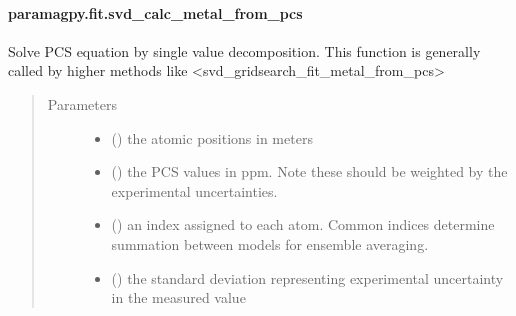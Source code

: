 \documentclass[a4paper,10pt,english,openany,oneside]{sphinxmanual}
\begin{document}
\paragraph{paramagpy.fit.svd\_calc\_metal\_from\_pcs}
\label{\detokenize{reference/generated/paramagpy.fit.svd_calc_metal_from_pcs:paramagpy-fit-svd-calc-metal-from-pcs}}\label{\detokenize{reference/generated/paramagpy.fit.svd_calc_metal_from_pcs::doc}}

\begin{fulllineitems}
\label{\detokenize{reference/generated/paramagpy.fit.svd_calc_metal_from_pcs:paramagpy.fit.svd_calc_metal_from_pcs}}
Solve PCS equation by single value decomposition.
This function is generally called by higher methods like
\textless{}svd\_gridsearch\_fit\_metal\_from\_pcs\textgreater{}
\begin{quote}\begin{description}
\item[{Parameters}] \leavevmode\begin{itemize}
\item {} 
 (\sphinxstyleliteralemphasis{\sphinxupquote{ {[}}}\sphinxstyleliteralemphasis{\sphinxupquote{,}}\sphinxstyleliteralemphasis{\sphinxupquote{,}}\sphinxstyleliteralemphasis{\sphinxupquote{{]} }}) \textendash{} the atomic positions in meters

\item {} 
 () \textendash{} the PCS values in ppm. Note these should be weighted by the
experimental uncertainties.

\item {} 
 () \textendash{} an index assigned to each atom. Common indices determine summation
between models for ensemble averaging.

\item {} 
 () \textendash{} the standard deviation representing experimental uncertainty
in the measured value


\end{itemize}
\end{description}
\end{quote}
\end{fulllineitems}
\end{document}
